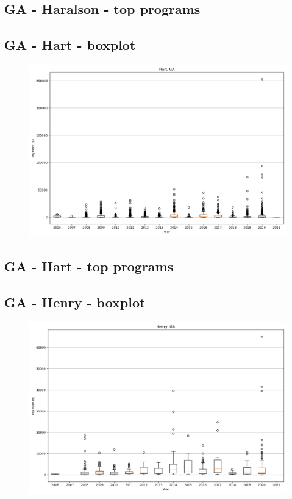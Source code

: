 \subsection*{GA - Haralson - top programs}

\newpage
\subsection*{GA - Hart - boxplot}
\begin{figure}[h]
\centering
\includegraphics[width=7in]{../output/boxplots/counties/Hart-GA_boxplot.png}
\end{figure}


\subsection*{GA - Hart - top programs}

\newpage
\subsection*{GA - Henry - boxplot}
\begin{figure}[h]
\centering
\includegraphics[width=7in]{../output/boxplots/counties/Henry-GA_boxplot.png}
\end{figure}


